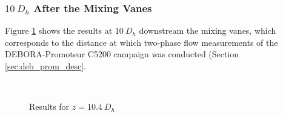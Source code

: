 \subsubsection{$10\ D_{h}$ After the Mixing Vanes}

Figure \ref{fig:agate_cfd_10dh} shows the results at $10\ D_{h}$ downstream the mixing vanes, which corresponds to the distance at which two-phase flow measurements of the DEBORA-Promoteur C5200 campaign was conducted (Section \ref{sec:deb_prom_desc}.

\begin{figure}[!h]
\centering
{}
\\
\caption{Results for $z=10.4\ D_{h}$}
\label{fig:agate_cfd_10dh}
\end{figure}

